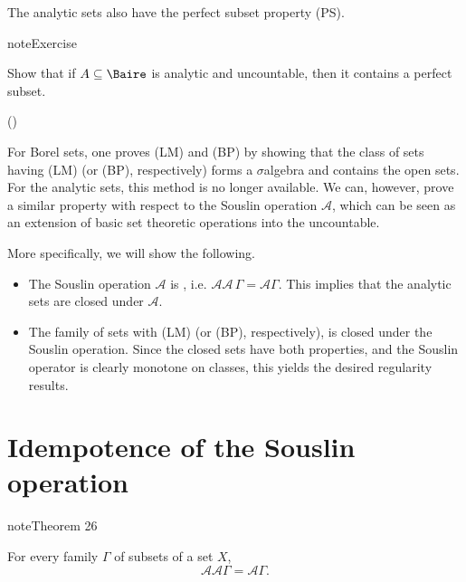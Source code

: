 \documentclass[letterpaper,10pt,english]{jupyterBook}
\begin{document}
\sphinxAtStartPar
The analytic sets also have the perfect subset property (PS).

\begin{sphinxadmonition}{note}{Exercise}

\sphinxAtStartPar
Show that if \(A \subseteq \Baire\) is analytic and uncountable, then it contains a perfect subset.

\sphinxAtStartPar
()
\end{sphinxadmonition}

\sphinxAtStartPar
For Borel sets, one proves (LM) and (BP) by showing that the class of sets having  (LM) (or (BP), respectively)  forms a \(\sigma\)\sphinxhyphen{}algebra and contains the open sets. For the analytic sets, this method is no longer available. We can, however, prove a similar property with respect to the Souslin operation \(\mathcal{A}\), which can be seen as an extension of basic set theoretic operations into the uncountable.

\sphinxAtStartPar
More specifically, we will show the following.
\begin{itemize}
\item {} 
\sphinxAtStartPar
The Souslin operation \(\mathcal{A}\) is , i.e. \(\mathcal{A}\mathcal{A} \, \Gamma = \mathcal{A}\Gamma\). This implies that the analytic sets are closed under \(\mathcal{A}\).

\item {} 
\sphinxAtStartPar
The family of sets with (LM) (or (BP), respectively), is closed under the Souslin operation. Since the closed sets have both properties, and the Souslin operator is clearly monotone on classes, this yields the desired regularity results.

\end{itemize}


\section{Idempotence of the Souslin operation}
\label{\detokenize{regularityAnalytic:idempotence-of-the-souslin-operation}}\label{regularityAnalytic:thm-idempotent-Souslin}
\begin{sphinxadmonition}{note}{Theorem 26}



\sphinxAtStartPar
For every family \(\Gamma\) of subsets of a set \(X\),
\begin{equation*}
    \mathcal{A} \mathcal{A} \Gamma = \mathcal{A} \Gamma.
\end{equation*}\end{sphinxadmonition}
\end{document}
